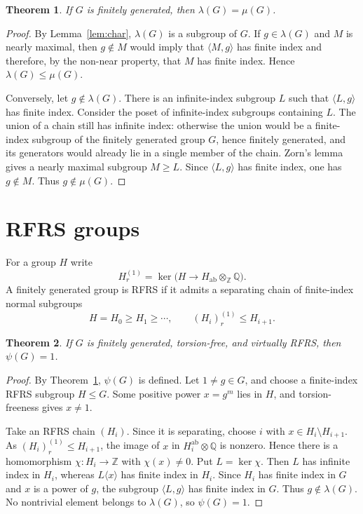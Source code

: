 \documentclass[11pt]{amsart}
\newtheorem{theorem}{Theorem}[section]
\newcommand{\Z}{\mathbb Z}
\newcommand{\Q}{\mathbb Q}
\begin{document}
\begin{theorem}\label{thm:eq}
If $G$ is finitely generated, then $\lambda(G)=\mu(G)$.
\end{theorem}
\begin{proof}
By Lemma~\ref{lem:char}, $\lambda(G)$ is a subgroup of $G$.  If $g\in\lambda(G)$ and $M$ is nearly maximal, then $g\notin M$ would imply that $\langle M,g\rangle$ has finite index and therefore, by the non-near property, that $M$ has finite index.  Hence $\lambda(G)\leq\mu(G)$.

Conversely, let $g\notin\lambda(G)$.  There is an infinite-index subgroup $L$ such that $\langle L,g\rangle$ has finite index.  Consider the poset of infinite-index subgroups containing $L$.  The union of a chain still has infinite index: otherwise the union would be a finite-index subgroup of the finitely generated group $G$, hence finitely generated, and its generators would already lie in a single member of the chain.  Zorn's lemma gives a nearly maximal subgroup $M\geq L$.  Since $\langle L,g\rangle$ has finite index, one has $g\notin M$.  Thus $g\notin\mu(G)$.
\end{proof}

\section{RFRS groups}
For a group $H$ write
\[
 H^{(1)}_{\!r}=\ker\bigl(H\longrightarrow H_{\mathrm{ab}}\otimes_{\Z}\Q\bigr).
\]
A finitely generated group is RFRS if it admits a separating chain of finite-index normal subgroups
\[
 H=H_0\geq H_1\geq\cdots,
 \qquad (H_i)^{(1)}_{\!r}\leq H_{i+1}.
\]

\begin{theorem}\label{thm:rfrs}
If $G$ is finitely generated, torsion-free, and virtually RFRS, then $\psi(G)=1$.
\end{theorem}
\begin{proof}
By Theorem~\ref{thm:eq}, $\psi(G)$ is defined.  Let $1\neq g\in G$, and choose a finite-index RFRS subgroup $H\leq G$.  Some positive power $x=g^m$ lies in $H$, and torsion-freeness gives $x\neq1$.

Take an RFRS chain $(H_i)$.  Since it is separating, choose $i$ with $x\in H_i\setminus H_{i+1}$.  As $(H_i)^{(1)}_{r}\leq H_{i+1}$, the image of $x$ in $H_i^{\mathrm{ab}}\otimes\Q$ is nonzero.  Hence there is a homomorphism $\chi:H_i\to\Z$ with $\chi(x)\neq0$.  Put $L=\ker\chi$.  Then $L$ has infinite index in $H_i$, whereas $L\langle x\rangle$ has finite index in $H_i$.  Since $H_i$ has finite index in $G$ and $x$ is a power of $g$, the subgroup $\langle L,g\rangle$ has finite index in $G$.  Thus $g\notin\lambda(G)$.  No nontrivial element belongs to $\lambda(G)$, so $\psi(G)=1$.
\end{proof}
\end{document}
